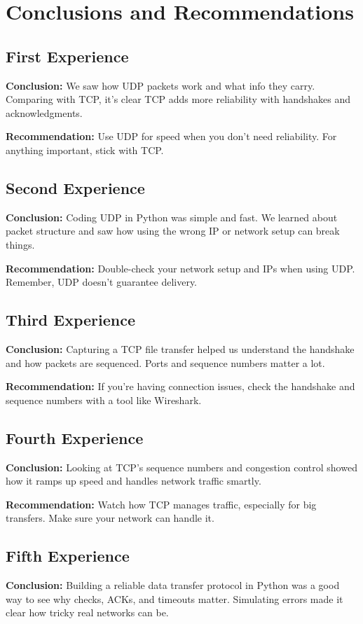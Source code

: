 \section{Conclusions and Recommendations}
\subsection{First Experience}
\textbf{Conclusion:} We saw how UDP packets work and what info they carry.
Comparing with TCP, it's clear TCP adds more reliability with handshakes and
acknowledgments.

\textbf{Recommendation:} Use UDP for speed when you don't need reliability. For
anything important, stick with TCP.

\subsection{Second Experience}
\textbf{Conclusion:} Coding UDP in Python was simple and fast. We learned about
packet structure and saw how using the wrong IP or network setup can break
things.

\textbf{Recommendation:} Double-check your network setup and IPs when using UDP.
Remember, UDP doesn't guarantee delivery.

\subsection{Third Experience}
\textbf{Conclusion:} Capturing a TCP file transfer helped us understand the
handshake and how packets are sequenced. Ports and sequence numbers matter a
lot.

\textbf{Recommendation:} If you're having connection issues, check the handshake
and sequence numbers with a tool like Wireshark.

\subsection{Fourth Experience}
\textbf{Conclusion:} Looking at TCP's sequence numbers and congestion control
showed how it ramps up speed and handles network traffic smartly.

\textbf{Recommendation:} Watch how TCP manages traffic, especially for big
transfers. Make sure your network can handle it.

\subsection{Fifth Experience}
\textbf{Conclusion:} Building a reliable data transfer protocol in Python was a
good way to see why checks, ACKs, and timeouts matter. Simulating errors made
it clear how tricky real networks can be.

